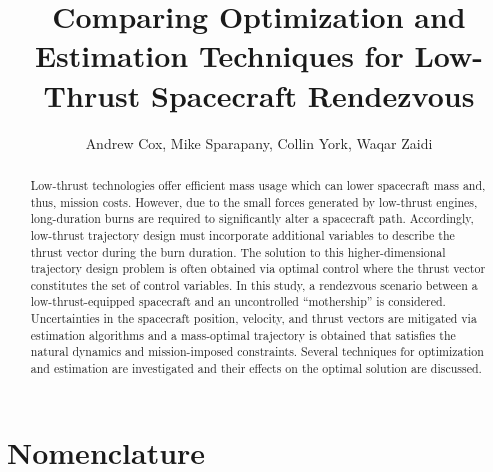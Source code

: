 \documentclass[conf]{new-aiaa}
\title{Comparing Optimization and Estimation Techniques for Low-Thrust Spacecraft Rendezvous}
\author{Andrew Cox, Mike Sparapany, Collin York, Waqar Zaidi}
\affil{Department of Aeronautics and Astronautics, Purdue University, West Lafayette, IN}
\begin{document}
\maketitle

\begin{abstract}
Low-thrust technologies offer efficient mass usage which can lower spacecraft mass and, thus, mission costs. However, due to the small forces generated by low-thrust engines, long-duration burns are required to significantly alter a spacecraft path. Accordingly, low-thrust trajectory design must incorporate additional variables to describe the thrust vector during the burn duration. The solution to this higher-dimensional trajectory design problem is often obtained via optimal control where the thrust vector constitutes the set of control variables. In this study, a rendezvous scenario between a low-thrust-equipped spacecraft and an uncontrolled ``mothership'' is considered. Uncertainties in the spacecraft position, velocity, and thrust vectors are mitigated via estimation algorithms and a mass-optimal trajectory is obtained that satisfies the natural dynamics and mission-imposed constraints. Several techniques for optimization and estimation are investigated and their effects on the optimal solution are discussed.
\end{abstract}

\section{Nomenclature}
\end{document}

